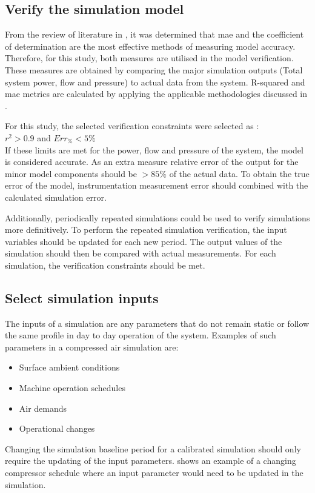 	\subsection{Verify the simulation model}
	From the review of literature in , it was determined that \gls{mae} and the coefficient of determination are the most effective methods of measuring model accuracy. Therefore, for this study, both measures are utilised in the model verification. These measures are obtained by comparing the major simulation outputs (Total system power, flow and pressure) to actual data from the system. R-squared and \gls{mae} metrics are calculated by applying the applicable methodologies discussed in .	
	\par 
	For this study, the selected verification constraints were selected as : \\ {$r^2 > 0.9 $ and $ Err_{\%} < 5\% $}\\ If these limits are met for the power, flow and pressure of the system, the model is considered accurate. As an extra measure relative error of the output for the minor model components should be $ > 85\%$ of the actual data. To obtain the true error of the model, instrumentation measurement error should combined with the calculated simulation error.
	\par 
	Additionally, periodically repeated simulations could be used to verify simulations more definitively. To perform the repeated simulation verification, the input variables should be updated for each new period. The output values of the simulation should then be compared with actual measurements. For each simulation, the verification constraints should be met.
		
	\subsection{Select simulation inputs}
		The inputs of a simulation are any parameters that do not remain static or follow the same profile in day to day operation of the system. Examples of such parameters in a compressed air simulation are:
		\begin{itemize}
			\item Surface ambient conditions
			\item Machine operation schedules
			\item Air demands
			\item Operational changes
		\end{itemize} 
	Changing the simulation baseline period for a calibrated simulation should only require the updating of the input parameters.  shows an example of a changing compressor schedule where an input parameter would need to be updated in the simulation.	

